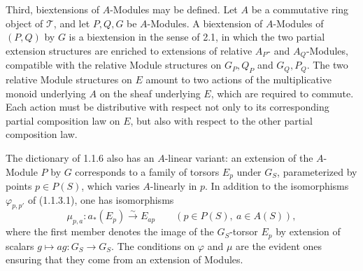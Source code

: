 \documentclass[11pt]{article}
\begin{document}
Third, biextensions of \(A\)-Modules may be defined.  Let \(A\) be a commutative ring object of \(\mathcal T\), and let \(P,Q,G\) be \(A\)-Modules.  A biextension of \(A\)-Modules of \((P,Q)\) by \(G\) is a biextension in the sense of 2.1, in which the two partial extension structures are enriched to extensions of relative \(A_P\)- and \(A_Q\)-Modules, compatible with the relative Module structures on \(G_P,Q_P\) and \(G_Q,P_Q\).  The two relative Module structures on \(E\) amount to two actions of the multiplicative monoid underlying \(A\) on the sheaf underlying \(E\), which are required to commute.  Each action must be distributive with respect not only to its corresponding partial composition law on \(E\), but also with respect to the other partial composition law.

The dictionary of 1.1.6 also has an \(A\)-linear variant: an extension of the \(A\)-Module \(P\) by \(G\) corresponds to a family of torsors \(E_p\) under \(G_S\), parameterized by points \(p\in P(S)\), which varies \(A\)-linearly in \(p\).  In addition to the isomorphisms \(\varphi_{p,p'}\) of (1.1.3.1), one has isomorphisms
\begin{equation}\tag{2.10.3.1}
  \mu_{p,a}: a_*(E_p)\xrightarrow{\sim} E_{ap}
  \qquad(p\in P(S),\ a\in A(S)),
\end{equation}
where the first member denotes the image of the \(G_S\)-torsor \(E_p\) by extension of scalars \(g\mapsto ag:G_S\to G_S\).  The conditions on \(\varphi\) and \(\mu\) are the evident ones ensuring that they come from an extension of Modules.
\end{document}
